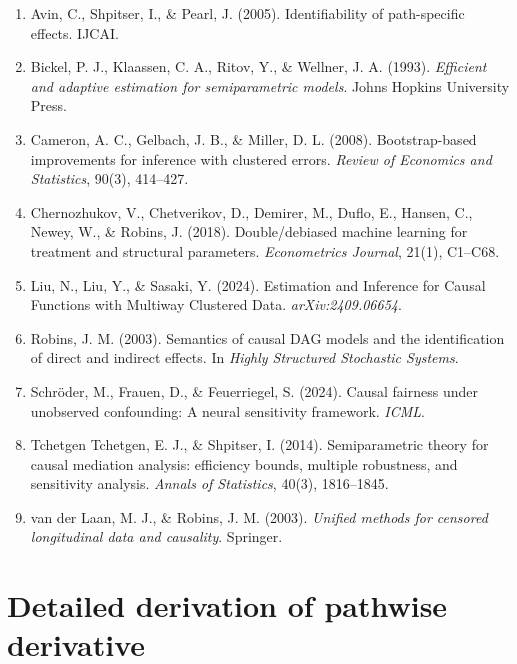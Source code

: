 \documentclass[11pt]{article}
\theoremstyle{plain}
\theoremstyle{definition}
\theoremstyle{remark}
\begin{document}
\begin{enumerate}[itemsep=2pt, leftmargin=*]
    \item Avin, C., Shpitser, I., \& Pearl, J. (2005). Identifiability of path-specific effects. IJCAI.
    
    \item Bickel, P. J., Klaassen, C. A., Ritov, Y., \& Wellner, J. A. (1993). \emph{Efficient and adaptive estimation for semiparametric models}. Johns Hopkins University Press.
    
    \item Cameron, A. C., Gelbach, J. B., \& Miller, D. L. (2008). Bootstrap-based improvements for inference with clustered errors. \emph{Review of Economics and Statistics}, 90(3), 414--427.
    
    \item Chernozhukov, V., Chetverikov, D., Demirer, M., Duflo, E., Hansen, C., Newey, W., \& Robins, J. (2018). Double/debiased machine learning for treatment and structural parameters. \emph{Econometrics Journal}, 21(1), C1--C68.
    
    \item Liu, N., Liu, Y., \& Sasaki, Y. (2024). Estimation and Inference for Causal Functions with Multiway Clustered Data. \emph{arXiv:2409.06654}.
    
    \item Robins, J. M. (2003). Semantics of causal DAG models and the identification of direct and indirect effects. In \emph{Highly Structured Stochastic Systems}.
    
    \item Schröder, M., Frauen, D., \& Feuerriegel, S. (2024). Causal fairness under unobserved confounding: A neural sensitivity framework. \emph{ICML}.
    
    \item Tchetgen Tchetgen, E. J., \& Shpitser, I. (2014). Semiparametric theory for causal mediation analysis: efficiency bounds, multiple robustness, and sensitivity analysis. \emph{Annals of Statistics}, 40(3), 1816--1845.
    
    \item van der Laan, M. J., \& Robins, J. M. (2003). \emph{Unified methods for censored longitudinal data and causality}. Springer.
\end{enumerate}

\appendix

\section{Detailed derivation of pathwise derivative}
\label{app:derivation}
\end{document}
